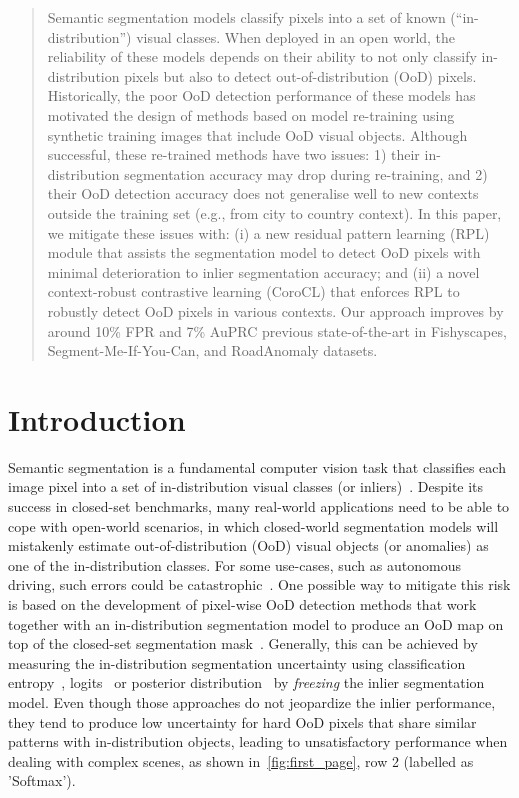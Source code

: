 \documentclass[10pt,twocolumn,letterpaper]{article}
\begin{document}
\begin{abstract}
\vspace{-10 pt}
Semantic segmentation models classify pixels into a set of known (``in-distribution'') visual classes. When deployed in an open world, the reliability of these models depends on their ability to not only  classify in-distribution pixels but  also to detect out-of-distribution (OoD) pixels. 
Historically, the poor OoD detection performance of these models has motivated the design of methods based on model re-training using synthetic training images that include OoD visual objects.
Although successful, these re-trained methods have two issues: 1) their in-distribution segmentation accuracy may drop during re-training, and 2) their OoD detection accuracy does not generalise well to new contexts outside the training set (e.g., from city to country context). 
In this paper, we mitigate these issues with: (i) a new residual pattern learning (RPL) module that assists the segmentation model to detect OoD pixels with minimal deterioration to inlier segmentation accuracy; and (ii) a novel context-robust contrastive learning (CoroCL) that enforces RPL to robustly detect OoD pixels in various contexts. Our approach improves by around 10\% FPR and 7\% AuPRC previous state-of-the-art in Fishyscapes, Segment-Me-If-You-Can, and RoadAnomaly datasets. 
\vspace{-15pt}
\end{abstract}

\section{Introduction}
\label{sec:intro}

Semantic segmentation is a fundamental computer vision task that classifies each image pixel into a set of in-distribution visual classes (or inliers)~\cite{hao2020brief}. 
Despite its success in closed-set benchmarks, many real-world applications need to be able to cope with open-world scenarios, in which closed-world segmentation models will mistakenly estimate out-of-distribution (OoD) visual objects (or anomalies) as one of the in-distribution classes. For some use-cases, such as autonomous driving, such errors could be catastrophic~\cite{hao2020brief,yurtsever2020survey}.
One possible way to mitigate this risk is based on the development of pixel-wise OoD detection methods that work together with an in-distribution segmentation model to produce an OoD map on top of the closed-set segmentation mask~\cite{jung2021standardized,  mukhoti2018evaluating, hendrycks2016baseline}. 
Generally, this can be achieved by measuring the in-distribution segmentation uncertainty using 
classification entropy~\cite{di2021pixel}, logits~\cite{jung2021standardized} or
posterior distribution~\cite{hendrycks2016baseline, neal2012bayesian} by \textit{freezing} the inlier segmentation model. Even though those approaches do not jeopardize the inlier performance, they tend to produce low uncertainty for hard OoD pixels that share similar patterns with in-distribution objects, leading to unsatisfactory performance when dealing with complex scenes, as shown in~\cref{fig:first_page}, row 2 (labelled as 'Softmax').
\end{document}
